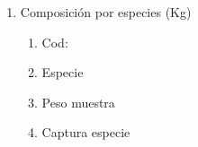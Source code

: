 \documentclass[a4paper,oneside,11pt]{book}
\begin{document}
\begin{figure} [!h]
  \begin{center}
   \end{center}
   \end{figure}

\begin{enumerate}
\item Composición por especies (Kg)
\begin{enumerate}
\item Cod:
\item Especie
\item Peso muestra
\item Captura especie
\end{enumerate}
\end{enumerate}


\begin{figure} [!h]
  \begin{center}
   \end{center}
   \end{figure}
\end{document}
